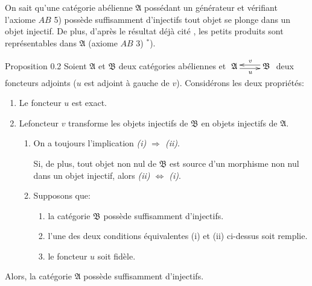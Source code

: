 \documentclass[10pt]{../fichiers-configuration-latex/smfart}
\begin{document}
\setcounter{subsection}{1}
\subsubsection{}

On sait \cite{SGA4-05:11} qu'une catégorie abélienne $\mathfrak{A}$
possédant un générateur et vérifiant l'axiome $AB$ 5) possède
suffisamment d'injectifs \ie tout objet se plonge dans un objet
injectif. De plus, d'après le résultat déjà cité \cite{SGA4-05:5}, les
petits produits sont représentables dans $\mathfrak{A}$ (axiome $AB$
3) $^{\ast}$).

\begin{enonce*}{Proposition 0.2}
Soient $\mathfrak{A}$ et $\mathfrak{B}$ deux
  catégories abéliennes et
$\xymatrix{\mathfrak{A} \ar@<-2pt>[r]_{u}& \mathfrak{B} \ar@<-2pt>[l]_{v}
}
$
deux foncteurs adjoints ($u$ est adjoint à gauche de
$v$). Considérons les deux propriétés:
\begin{enumerate}
\renewcommand{\theenumi}{\roman{enumi}}
\renewcommand{\labelenumi}{\theenumi)}
\item Le foncteur $u$ est exact.

\item Le\pageoriginale foncteur $v$ transforme les objets injectifs de $\mathfrak{B}$
  en objets injectifs de $\mathfrak{A}$.
\begin{enumerate}
\renewcommand{\theenumii}{\arabic {enumii}}
\renewcommand{\labelenumii}{\theenumii)}
\item On a toujours l'implication \emph{(i) $\Rightarrow$ (ii)}.

Si, de plus, tout objet non nul de $\mathfrak{B}$ est source d'un morphisme non
  nul dans un objet injectif, alors \emph{(ii) $\Leftrightarrow$ (i)}.
\item Supposons que:
\begin{enumerate}
\renewcommand{\theenumiii}{\alph {enumiii}}
\renewcommand{\labelenumiii}{\theenumiii)}
\item la catégorie $\mathfrak{B}$ possède suffisamment
  d'injectifs.
\item l'une des deux conditions équivalentes {\rm(i)} et {\rm(ii)} ci-dessus
  soit remplie.
\item le foncteur $u$ soit fidèle.
\end{enumerate}
\end{enumerate}
\end{enumerate}
Alors, la catégorie $\mathfrak{A}$ possède suffisamment d'injectifs.
\end{enonce*}
\end{document}
